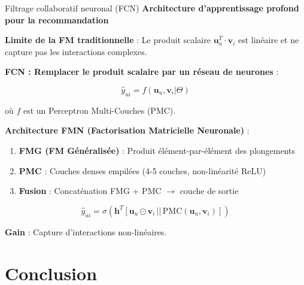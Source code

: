 \documentclass[9pt, aspectratio=169]{beamer}
\begin{document}
\begin{frame}{Filtrage collaboratif neuronal (FCN)}
    \textbf{Architecture d'apprentissage profond pour la recommandation}
    
    \vspace{0.3cm}
    \textbf{Limite de la FM traditionnelle} : Le produit scalaire \(\mathbf{u}_u^T \cdot \mathbf{v}_i\) est linéaire et ne capture pas les interactions complexes.
    
    \vspace{0.3cm}
    \textbf{FCN : Remplacer le produit scalaire par un réseau de neurones} :
    
    \[
    \hat{y}_{ui} = f(\mathbf{u}_u, \mathbf{v}_i | \Theta)
    \]
    
    où \(f\) est un Perceptron Multi-Couches (PMC).
    
    \vspace{0.3cm}
    \textbf{Architecture FMN (Factorisation Matricielle Neuronale)} :
    \begin{enumerate}
        \item \textbf{FMG (FM Généralisée)} : Produit élément-par-élément des plongements
        \item \textbf{PMC} : Couches denses empilées (4-5 couches, non-linéarité ReLU)
        \item \textbf{Fusion} : Concaténation FMG + PMC $\rightarrow$ couche de sortie
    \end{enumerate}
    
    \[
    \hat{y}_{ui} = \sigma\left( \mathbf{h}^T \left[ \mathbf{u}_u \odot \mathbf{v}_i \, || \, \text{PMC}(\mathbf{u}_u, \mathbf{v}_i) \right] \right)
    \]
    
    \textbf{Gain} : Capture d'interactions non-linéaires.
\end{frame}

\section{Conclusion}
\end{document}
